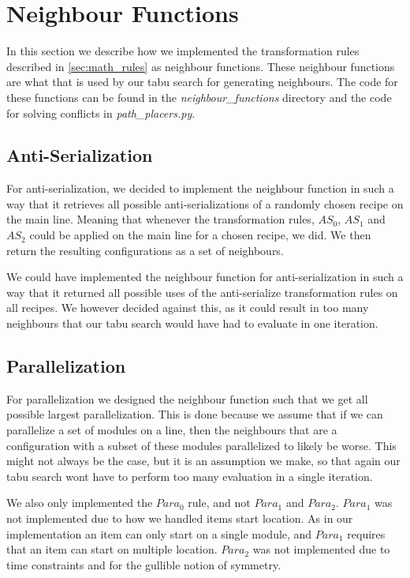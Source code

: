 \section{Neighbour Functions}
In this section we describe how we implemented the transformation rules described in \cref{sec:math_rules} as neighbour functions. These neighbour functions are what that is used by our tabu search for generating neighbours. The code for these functions can be found in the \textit{neighbour\_functions} directory and the code for solving conflicts in \textit{path\_placers.py}.


\subsection{Anti-Serialization}
For anti-serialization, we decided to implement the neighbour function in such a way that it retrieves all possible anti-serializations of a randomly chosen recipe on the main line. Meaning that whenever the transformation rules, $AS_0$, $AS_1$ and $AS_2$ could be applied on the main line for a chosen recipe, we did. We then return the resulting configurations as a set of neighbours.

We could have implemented the neighbour function for anti-serialization in such a way that it returned all possible uses of the anti-serialize transformation rules on all recipes. We however decided against this, as it could result in too many neighbours that our tabu search would have had to evaluate in one iteration.


\subsection{Parallelization}
For parallelization we designed the neighbour function such that we get all possible largest parallelization. This is done because we assume that if we can parallelize a set of modules on a line, then the neighbours that are a configuration with a subset of these modules parallelized to likely be worse. This might not always be the case, but it is an assumption we make, so that again our tabu search wont have to perform too many evaluation in a single iteration. 

We also only implemented the $Para_0$ rule, and not $Para_1$ and $Para_2$. $Para_1$ was not implemented due to how we handled items start location. As in our implementation an item can only start on a single module, and $Para_1$ requires that an item can start on multiple location. $Para_2$ was not implemented due to time constraints and for the gullible notion of symmetry.


